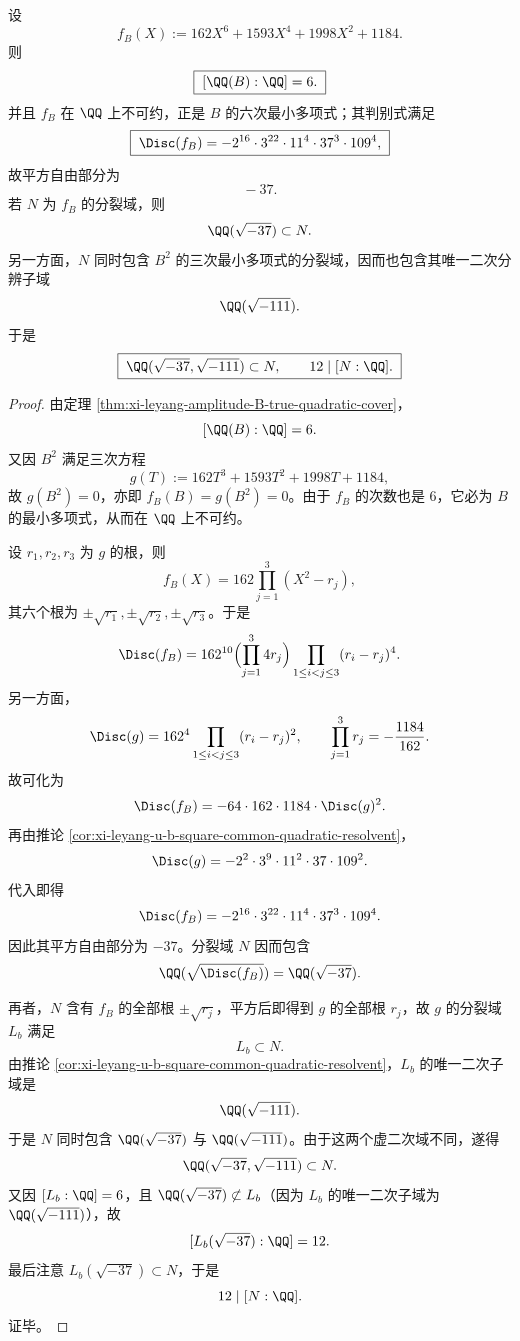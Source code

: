 \begin{theorem}\label{thm:xi-leyang-amplitude-B-sextic-biquadratic-shadow}
设
\[
f_B(X):=162X^6+1593X^4+1998X^2+1184.
\]
则
\[
\boxed{\;[\QQ(B):\QQ]=6.\;}
\]
并且 \(f_B\) 在 \(\QQ\) 上不可约，正是 \(B\) 的六次最小多项式；其判别式满足
\[
\boxed{\;
\Disc(f_B)=
-2^{16}\cdot 3^{22}\cdot 11^4\cdot 37^3\cdot 109^4,\;}
\]
故平方自由部分为
\[
\boxed{\;-37.\;}
\]
若 \(N\) 为 \(f_B\) 的分裂域，则
\[
\QQ(\sqrt{-37})\subset N.
\]
另一方面，\(N\) 同时包含 \(B^2\) 的三次最小多项式的分裂域，因而也包含其唯一二次分辨子域
\[
\QQ(\sqrt{-111}).
\]
于是
\[
\boxed{\;
\QQ(\sqrt{-37},\sqrt{-111})\subset N,
\qquad
12\mid [N:\QQ].\;}
\]
\end{theorem}
\begin{proof}
由定理 \ref{thm:xi-leyang-amplitude-B-true-quadratic-cover}，
\[
[\QQ(B):\QQ]=6.
\]
又因 \(B^2\) 满足三次方程
\[
g(T):=162T^3+1593T^2+1998T+1184,
\]
故 \(g(B^2)=0\)，亦即 \(f_B(B)=g(B^2)=0\)。由于 \(f_B\) 的次数也是 \(6\)，它必为 \(B\) 的最小多项式，从而在 \(\QQ\) 上不可约。

设 \(r_1,r_2,r_3\) 为 \(g\) 的根，则
\[
f_B(X)=162\prod_{j=1}^{3}(X^2-r_j),
\]
其六个根为 \(\pm \sqrt{r_1},\pm \sqrt{r_2},\pm \sqrt{r_3}\)。于是
\[
\Disc(f_B)
=
162^{10}\Bigl(\prod_{j=1}^{3}4r_j\Bigr)
\prod_{1\le i<j\le 3}(r_i-r_j)^4.
\]
另一方面，
\[
\Disc(g)=162^4\prod_{1\le i<j\le 3}(r_i-r_j)^2,
\qquad
\prod_{j=1}^{3}r_j=-\frac{1184}{162}.
\]
故可化为
\[
\Disc(f_B)
=
-64\cdot 162\cdot 1184\cdot \Disc(g)^2.
\]
再由推论 \ref{cor:xi-leyang-u-b-square-common-quadratic-resolvent}，
\[
\Disc(g)=
-2^2\cdot 3^9\cdot 11^2\cdot 37\cdot 109^2.
\]
代入即得
\[
\Disc(f_B)=
-2^{16}\cdot 3^{22}\cdot 11^4\cdot 37^3\cdot 109^4.
\]
因此其平方自由部分为 \(-37\)。分裂域 \(N\) 因而包含
\[
\QQ(\sqrt{\Disc(f_B)})=\QQ(\sqrt{-37}).
\]

再者，\(N\) 含有 \(f_B\) 的全部根 \(\pm\sqrt{r_j}\)，平方后即得到 \(g\) 的全部根 \(r_j\)，故 \(g\) 的分裂域 \(L_b\) 满足
\[
L_b\subset N.
\]
由推论 \ref{cor:xi-leyang-u-b-square-common-quadratic-resolvent}，\(L_b\) 的唯一二次子域是
\[
\QQ(\sqrt{-111}).
\]
于是 \(N\) 同时包含 \(\QQ(\sqrt{-37})\) 与 \(\QQ(\sqrt{-111})\)。由于这两个虚二次域不同，遂得
\[
\QQ(\sqrt{-37},\sqrt{-111})\subset N.
\]
又因 \([L_b:\QQ]=6\)，且 \(\QQ(\sqrt{-37})\not\subset L_b\)（因为 \(L_b\) 的唯一二次子域为 \(\QQ(\sqrt{-111})\)），故
\[
[L_b(\sqrt{-37}):\QQ]=12.
\]
最后注意 \(L_b(\sqrt{-37})\subset N\)，于是
\[
12\mid [N:\QQ].
\]
证毕。
\end{proof}

\endinput
